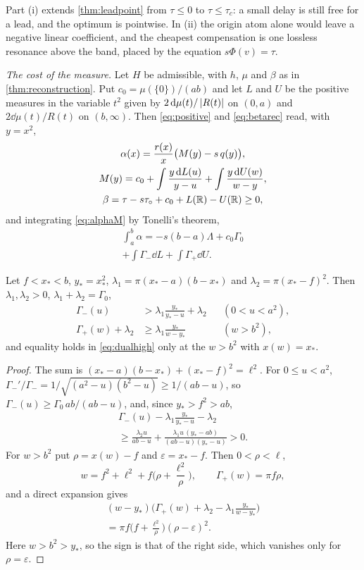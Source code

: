 Part (i) extends \cref{thm:leadpoint} from $\tau\le0$ to $\tau\le\tau_c$: a
small delay is still free for a lead, and the optimum is pointwise. In (ii)
the origin atom alone would leave a negative linear coefficient, and the
cheapest compensation is one lossless resonance above the band, placed by
the equation $s\Phi(v)=\tau$.

\emph{The cost of the measure.} Let $H$ be admissible, with $h$, $\mu$ and
$\beta$ as in \cref{thm:reconstruction}. Put $c_0=\mu(\{0\})/(ab)$ and let $L$
and $U$ be the positive measures in the variable $t^2$ given by
$2\,\mathrm d\mu(t)/\left|R(t)\right|$ on $(0,a)$ and $2\dd\mu(t)/R(t)$ on $(b,\infty)$. Then
\eqref{eq:positive} and \eqref{eq:betarec} read, with $y=x^2$,
\begin{gather}
\alpha(x)=\frac{r(x)}x\big(M(y)-s\,q(y)\big),\label{eq:alphaM}\\
M(y)=c_0+\int\frac{y\,\mathrm d L(u)}{y-u}+\int\frac{y\,\mathrm d U(w)}{w-y},\notag\\
\beta=\tau-s\tau_\circ+c_0+L(\mathbb R)-U(\mathbb R)\ge0,\label{eq:betaM}
\end{gather}
and integrating \eqref{eq:alphaM} by Tonelli's theorem,
\begin{multline}\label{eq:costM}
\int_a^b\alpha=-s(b-a)\Lambda+c_0\Gamma_0\\
+\int\Gamma_-\dd L+\int\Gamma_+\dd U .
\end{multline}

\begin{lemma}\label{lem:meandual}
Let $f<x_*<b$, $y_*=x_*^2$, $\lambda_1=\pi(x_*-a)(b-x_*)$ and
$\lambda_2=\pi(x_*-f)^2$. Then $\lambda_1,\lambda_2>0$,
$\lambda_1+\lambda_2=\Gamma_0$,
\begin{align}
\Gamma_-(u)&>\lambda_1\frac{y_*}{y_*-u}+\lambda_2&&(0<u<a^2),\label{eq:duallow}\\
\Gamma_+(w)+\lambda_2&\ge\lambda_1\frac{y_*}{w-y_*}&&(w>b^2),\label{eq:dualhigh}
\end{align}
and equality holds in \eqref{eq:dualhigh} only at the $w>b^2$ with
$x(w)=x_*$.
\end{lemma}

\begin{proof}
The sum is $(x_*-a)(b-x_*)+(x_*-f)^2=\ell^2$. For $0\le u<a^2$,
$\Gamma_-'/\Gamma_-=1/\sqrt{(a^2-u)(b^2-u)}\ge1/(ab-u)$, so
$\Gamma_-(u)\ge\Gamma_0\,ab/(ab-u)$, and, since $y_*>f^2>ab$,
\begin{multline*}
\Gamma_-(u)-\lambda_1\frac{y_*}{y_*-u}-\lambda_2\\
\ge\frac{\lambda_2u}{ab-u}+\frac{\lambda_1u\,(y_*-ab)}{(ab-u)(y_*-u)}>0 .
\end{multline*}
For $w>b^2$ put $\rho=x(w)-f$ and $\varepsilon=x_*-f$. Then $0<\rho<\ell$,
\[
w=f^2+\ell^2+f\Big(\rho+\frac{\ell^2}\rho\Big),\qquad \Gamma_+(w)=\pi f\rho,
\]
and a direct expansion gives
\begin{multline}\label{eq:square}
(w-y_*)\Big(\Gamma_+(w)+\lambda_2-\lambda_1\frac{y_*}{w-y_*}\Big)\\
=\pi f\Big(f+\frac{\ell^2}\rho\Big)(\rho-\varepsilon)^2 .
\end{multline}
Here $w>b^2>y_*$, so the sign is that of the right side, which vanishes only
for $\rho=\varepsilon$.
\end{proof}

